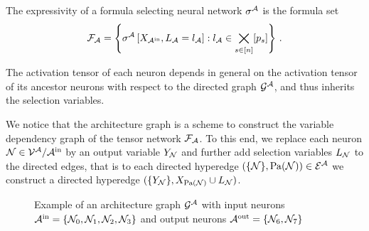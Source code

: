 \begin{definition}
    The expressivity of a formula selecting neural network $\sigma^{\mathcal{A}}$ is the formula set
    \begin{align*}
        \mathcal{F}_{\mathcal{A}} = \left\{ \sigma^{\mathcal{A}}\left[X_{\mathcal{A}^{\mathrm{in}}},L_{\mathcal{A}}=l_{\mathcal{A}}\right]  : l_{\mathcal{A}}\in\bigtimes_{s\in[n]}[p_{s}] \right\} \, .
    \end{align*}

\end{definition}

The activation tensor of each neuron depends in general on the activation tensor of its ancestor neurons with respect to the directed graph $\mathcal{G}^{\mathcal{A}}$, and thus inherits the selection variables.

We notice that the architecture graph is a scheme to construct the variable dependency graph of the tensor network $\mathcal{F}_{\mathcal{A}}$.
To this end, we replace each neuron $\mathcal{N}\in\mathcal{V}^{\mathcal{A}}/\mathcal{A}^{\mathrm{in}}$ by an output variable $Y_{\mathcal{N}}$ and further add selection variables $L_{\mathcal{N}}$ to the directed edges, that is to each directed hyperedge $(\{\mathcal{N}\}, \mathrm{Pa}(\mathcal{N}))\in\mathcal{E}^{\mathcal{A}}$ we construct a directed hyperedge $(\{Y_{\mathcal{N}}\}, X_{\mathrm{Pa}(\mathcal{N})}\cup L_{\mathcal{N}})$.

\begin{figure}[h]
    \begin{center}
        
    \end{center}
    \caption{Example of an architecture graph $\mathcal{G}^{\mathcal{A}}$ with input neurons $\mathcal{A}^{\mathrm{in}}=\{\mathcal{N}_{0},\mathcal{N}_{1},\mathcal{N}_{2},\mathcal{N}_{3}\}$ and output neurons $\mathcal{A}^{\mathrm{out}}=\{\mathcal{N}_{6},\mathcal{N}_{7}\}$
    }
    \label{fig:architectureGraph}
\end{figure}


